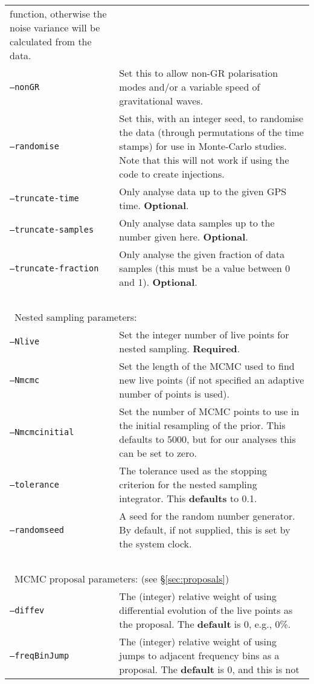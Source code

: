 \begin{footnotesize}
\begin{longtable}{|p{}p{}|}
                            function, otherwise the noise variance will be calculated from the data. \\
 {\tt --nonGR}           &  Set this to allow non-GR polarisation modes and/or a variable speed of gravitational waves. \\
 {\tt --randomise}       &  Set this, with an integer seed, to randomise the data (through permutations of the time stamps) for
                            use in Monte-Carlo studies. Note that this will not work if using the code to create injections. \\
 {\tt --truncate-time}   &  Only analyse data up to the given GPS time. {\bf Optional}. \\
 {\tt --truncate-samples}&  Only analyse data samples up to the number given here. {\bf Optional}. \\
 {\tt --truncate-fraction}& Only analyse the given fraction of data samples (this must be a value between 0 and 1). {\bf Optional}. \\
 ~ & ~ \\
\multicolumn{2}{|l|}{~Nested sampling parameters:} \\
 {\tt --Nlive}           &  Set the integer number of live points for nested sampling. {\bf Required}. \\
 {\tt --Nmcmc}           &  Set the length of the MCMC used to find new live points (if not specified an adaptive number of
                            points is used). \\
 {\tt --Nmcmcinitial}    &  Set the number of MCMC points to use in the initial resampling of the prior. This defaults to 5000, but
                            for our analyses this can be set to zero. \\
 {\tt --tolerance}       &  The tolerance used as the stopping criterion for the nested sampling integrator. This {\bf defaults} to 0.1. \\
 {\tt --randomseed}      &  A seed for the random number generator. By default, if not supplied, this is set by the system clock. \\
 ~ & ~ \\
\multicolumn{2}{|l|}{~MCMC proposal parameters: (see \S\ref{sec:proposals})} \\
 {\tt --diffev}          &  The (integer) relative weight of using differential evolution of the live points as the proposal. The {\bf default} is 0,
                            e.g., 0\%. \\
 {\tt --freqBinJump}     &  The (integer) relative weight of using jumps to adjacent frequency bins as a proposal. The {\bf default} is 0, and this is not

\end{longtable}
\end{footnotesize}
